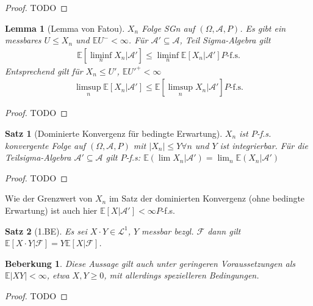 \documentclass[]{article}
\newtheorem{theorem}{Satz}
\newtheorem{lemma}{Lemma}
\newtheorem*{remark}{Beberkung}
\begin{document}
\begin{proof}
	TODO
\end{proof}

\begin{lemma}[Lemma von Fatou]
	$X_n$ Folge SGn auf $(\Omega, \mathcal{A}, P)$. Es gibt ein messbares $U \leq X_n$ und $\mathbb{E}U^- < \infty$. Für $\mathcal{A}' \subseteq \mathcal{A}$, Teil Sigma-Algebra gilt
	\begin{align*}
		\mathbb{E}[\liminf_n X_n | \mathcal{A}'] \leq \liminf_n \mathbb{E}[X_n|\mathcal{A}'] P\text{-f.s.}
	\end{align*}
	Entsprechend gilt für $X_n \leq U'$, $\mathbb{E}U'^+ < \infty$
	\begin{align*}
		\limsup_n \mathbb{E}[X_n | \mathcal{A}'] \leq \mathbb{E}[\limsup_n X_n|\mathcal{A}'] P\text{-f.s.}
	\end{align*}
\end{lemma}

\begin{proof}
	TODO
\end{proof}

\begin{theorem}[Dominierte Konvergenz für bedingte Erwartung]
	$X_n$ ist $P$-f.s. konvergente Folge auf $(\Omega, \mathcal{A}, P)$ mit $|X_n| \leq Y \forall n$ und $Y$ ist integrierbar. Für die Teilsigma-Algebra $\mathcal{A}' \subseteq \mathcal{A}$ gilt $P$-f.s: $\mathbb{E}(\lim X_n | \mathcal{A}') = \lim_n \mathbb{E}(X_n|\mathcal{A}')$
\end{theorem}

\begin{proof}
	TODO
\end{proof}

Wie der Grenzwert von $X_n$ im Satz der dominierten Konvergenz (ohne bedingte Erwartung) ist auch hier $\mathbb{E}[X|\mathcal{A}'] < \infty P$-f.s.

\begin{theorem}[1.BE]
	Es sei $X\cdot Y \in \mathcal{L}^1$, $Y$ messbar bezgl. $\mathcal{F}$ dann gilt $\mathbb{E}[X\cdot Y | \mathcal{F}]= Y \mathbb{E}[X|\mathcal{F}]$.
\end{theorem}

\begin{remark}
	Diese Aussage gilt auch unter geringeren Voraussetzungen als $\mathbb{E}|XY| <\infty$, etwa $X,Y \geq 0$, mit allerdings spezielleren Bedingungen.
\end{remark}

\begin{proof}
	TODO
\end{proof}
\end{document}
